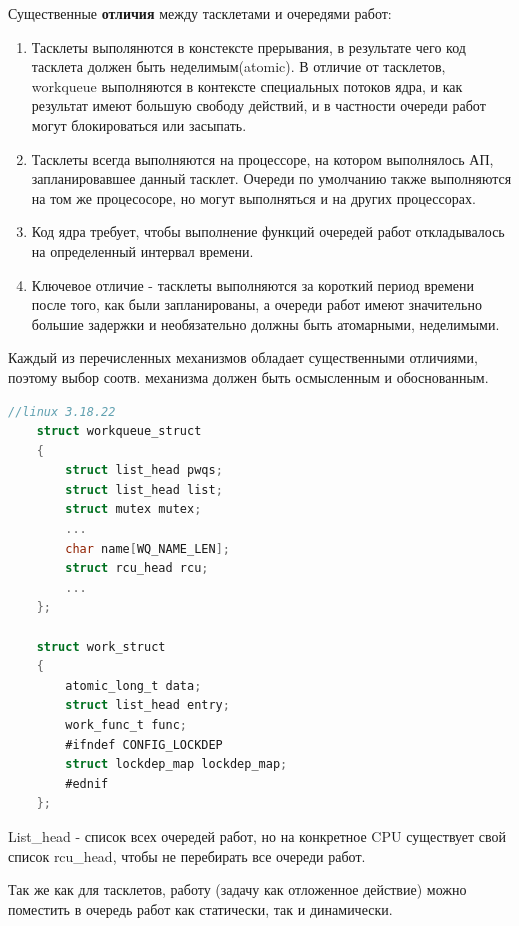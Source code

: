 \documentclass[12pt,a4paper]{scrreprt}
\begin{document}
Существенные \textbf{отличия} между тасклетами и очередями работ:

\begin{enumerate}
	\item Тасклеты выполянются в констексте прерывания, в результате чего код тасклета должен быть неделимым(atomic). В отличие от тасклетов, workqueue выполняются в контексте специальных потоков ядра, и как результат имеют большую свободу действий, и в частности очереди работ могут блокироваться или засыпать.
	\item Тасклеты всегда выполняются на процессоре, на котором выполнялось АП, запланировавшее данный тасклет. Очереди по умолчанию также выполняются на том же процесосоре, но могут выполняться и на других процессорах.
	\item Код ядра требует, чтобы выполнение функций очередей работ откладывалось на
	определенный интервал времени.
	\item Ключевое отличие - тасклеты выполняются за короткий период времени после того, как были запланированы, а очереди работ имеют значительно большие задержки и необязательно должны быть атомарными, неделимыми.
\end{enumerate}

Каждый из перечисленных механизмов обладает существенными отличиями, поэтому выбор соотв. механизма должен быть осмысленным и обоснованным.

\begin{lstlisting}[language=C]
	//linux 3.18.22
	struct workqueue_struct
	{
		struct list_head pwqs;
		struct list_head list;
		struct mutex mutex;
		...
		char name[WQ_NAME_LEN];
		struct rcu_head rcu;
		...
	};
	
	struct work_struct 
	{
		atomic_long_t data;
		struct list_head entry;
		work_func_t func;
		#ifndef CONFIG_LOCKDEP
		struct lockdep_map lockdep_map;
		#ednif
	};
\end{lstlisting}

List\_head - список всех очередей работ, но на конкретное CPU существует свой список rcu\_head, чтобы не перебирать все очереди работ.

Так же как для тасклетов, работу (задачу как отложенное действие) можно поместить в очередь работ как статически, так и динамически. 
\end{document}
